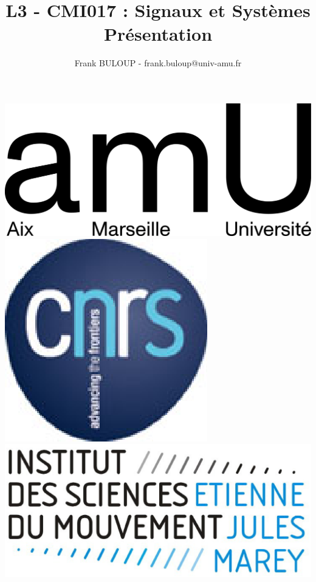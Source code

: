 \documentclass[a4paper,11pt]{beamer}
\title{L3 - CMI017 : Signaux et Systèmes\\Présentation}
\author{Frank BULOUP - frank.buloup@univ-amu.fr}
\institute{Aix Marseille Université\\Institut des Sciences du Mouvement}
\date{}
\begin{document}
 


\begin{frame}[plain] 
	\titlepage 
	\vspace{1cm}
	
	\includegraphics[scale=0.6]{images/LogoAMU.png}\hspace*{2cm}
	\includegraphics[scale=0.2]{images/LogoCNRS.eps}\hspace*{2cm}
	\includegraphics[scale=0.1]{images/LogoISM.eps}
\end{frame} 
\end{document}
